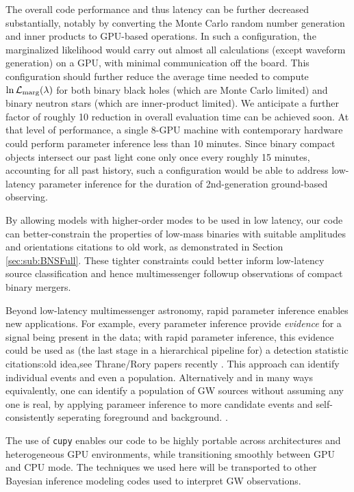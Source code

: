 \documentclass[twocolumn,prd,nofootinbib]{revtex4}
\newcommand\editremark[1]{{\color{red} #1}}
\begin{document}
The overall code performance and thus latency can be further decreased substantially, notably by converting the Monte
Carlo random number generation and inner products to GPU-based operations.  In such a configuration, the marginalized
likelihood would carry out almost all calculations (except waveform generation) on a GPU, with minimal communication off
the board.  This configuration should further reduce the average time needed to compute $\ln {\cal L}_{\rm
  marg}(\lambda)$ for both binary black holes (which are Monte Carlo limited) and binary neutron stars (which are
inner-product limited).   We anticipate a further factor of roughly 10 reduction in overall evaluation time can be
achieved soon.  At that level of performance, a single 8-GPU machine with contemporary hardware could perform parameter inference less than 10
minutes.    Since binary compact objects intersect our past light cone only once every roughly 15 minutes, accounting
for all past history, such a configuration would be able to address low-latency parameter inference for the duration of
2nd-generation ground-based observing.

By allowing  models with higher-order modes to be used in low latency, our code can better-constrain the properties of low-mass
binaries with suitable amplitudes and orientations \editremark{citations to old work}, as demonstrated in Section
\ref{sec:sub:BNSFull}.  These tighter constraints could
better  inform low-latency source classification and hence multimessenger followup observations of compact binary mergers.

Beyond low-latency multimessenger astronomy, rapid parameter inference enables new applications.  For example, every
parameter inference provide \emph{evidence} for a signal being present in the data; with rapid parameter inference, this
evidence could be used as (the last stage in a hierarchical pipeline for) a detection statistic
\editremark{citations:old idea,see Thrane/Rory papers recently} \cite{2018PhRvX...8b1019S}.    This approach can identify individual events and
even a population.
Alternatively and in many ways equivalently, one can identify a population of GW sources without assuming any one is
real, by  applying parameer inference to more candidate events and self-consistently seperating foreground and
background. 
\cite{2015PhRvD..91b3005F,2019MNRAS.tmp..230G}.



The use of \texttt{cupy} enables our code to be highly portable across architectures and heterogeneous GPU environments,
while transitioning smoothly between GPU and CPU mode.     The techniques we used here will be transported to other
Bayesian inference modeling codes used to interpret GW observations.
\end{document}
